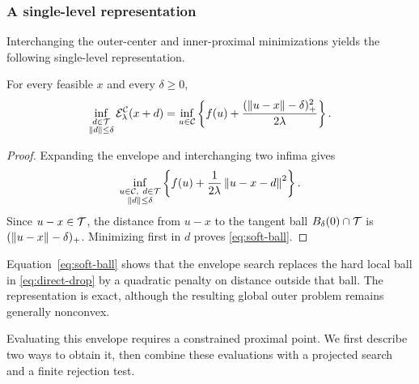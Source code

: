 \subsubsection{A single-level representation}

Interchanging the outer-center and inner-proximal minimizations yields the
following single-level representation.
\begin{lemma}
  \label{lem:soft-ball}
  For every feasible \(x\) and every \(\delta\ge0\),
  \begin{equation}
    \inf_{\substack{d\in\mathcal{T}\\\left\lVert d\right\rVert\le\delta}}
      \mathcal{E}_\lambda^{\mathcal{C}}(x+d)
    =
    \inf_{u\in\mathcal{C}}
    \left\{
      f(u)
      +\frac{(\left\lVert u-x\right\rVert-\delta)_+^{2}}{2\lambda}
    \right\}.
    \label{eq:soft-ball}
  \end{equation}
\end{lemma}

\begin{proof}
  Expanding the envelope and interchanging two infima gives
  \[
    \inf_{\substack{u\in\Cset,\ d\in\Tspace\\\norm d\le\delta}}
    \left\{
      f(u)+\frac{1}{2\lambda}\norm{u-x-d}^{2}
    \right\}.
  \]
  Since \(u-x\in\mathcal{T}\), the distance from \(u-x\) to the tangent ball
  \(B_\delta(0)\cap\mathcal{T}\) is
  \((\left\lVert u-x\right\rVert-\delta)_+\).  Minimizing first in \(d\) proves
  \cref{eq:soft-ball}.
\end{proof}

Equation~\eqref{eq:soft-ball} shows that the envelope search replaces the
hard local ball in \cref{eq:direct-drop} by a quadratic penalty on distance
outside that ball.  The representation is exact, although the resulting
global outer problem remains generally nonconvex.

Evaluating this envelope requires a constrained proximal point.  We first
describe two ways to obtain it, then combine these evaluations with a
projected search and a finite rejection test.
